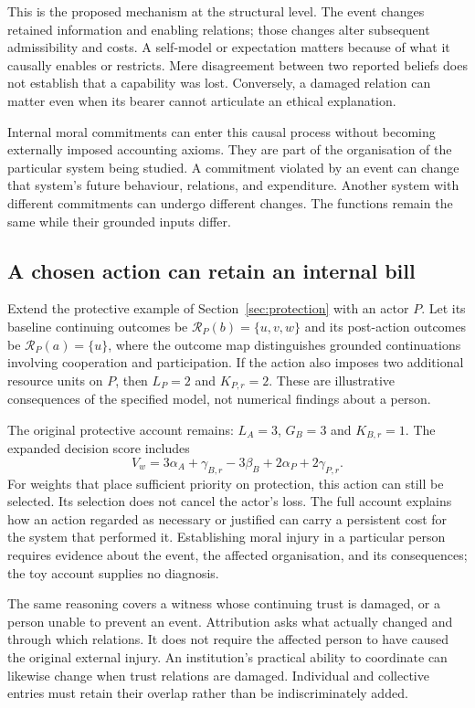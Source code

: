 \documentclass[11pt,a4paper]{article}
\theoremstyle{remark}
\newcommand{\R}{\mathcal R}
\begin{document}
This is the proposed mechanism at the structural level. The event changes
retained information and enabling relations; those changes alter subsequent
admissibility and costs. A self-model or expectation matters because of what it
causally enables or restricts. Mere disagreement between two reported beliefs
does not establish that a capability was lost. Conversely, a damaged relation
can matter even when its bearer cannot articulate an ethical explanation.

Internal moral commitments can enter this causal process without becoming
externally imposed accounting axioms. They are part of the organisation of the
particular system being studied. A commitment violated by an event can change
that system's future behaviour, relations, and expenditure. Another system with
different commitments can undergo different changes. The functions remain the
same while their grounded inputs differ.

\subsection{A chosen action can retain an internal bill}

Extend the protective example of Section~\ref{sec:protection} with an actor $P$.
Let its baseline continuing outcomes be
$\R_P(b)=\{u,v,w\}$ and its post-action outcomes be $\R_P(a)=\{u\}$, where the
outcome map distinguishes grounded continuations involving cooperation and
participation. If the action also imposes two additional resource units on $P$,
then $L_P=2$ and $K_{P,r}=2$. These are illustrative consequences of the specified
model, not numerical findings about a person.

The original protective account remains: $L_A=3$, $G_B=3$ and $K_{B,r}=1$.
The expanded decision score includes
\[
V_w=3\alpha_A+\gamma_{B,r}-3\beta_B
       +2\alpha_P+2\gamma_{P,r}.
\]
For weights that place sufficient priority on protection, this action can
still be selected. Its selection does not cancel the actor's loss. The full
account explains how an action regarded as necessary or justified can carry a
persistent cost for the system that performed it. Establishing moral injury in
a particular person requires evidence about the event, the affected organisation,
and its consequences; the toy account supplies no diagnosis.

The same reasoning covers a witness whose continuing trust is damaged, or a
person unable to prevent an event. Attribution asks what actually changed and
through which relations. It does not require the affected person to have caused
the original external injury. An institution's practical ability to coordinate
can likewise change when trust relations are damaged. Individual and collective
entries must retain their overlap rather than be indiscriminately added.
\end{document}
